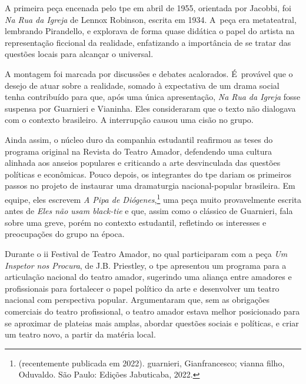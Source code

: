 {A primeira peça encenada pelo {\sc tpe} em abril de 1955, orientada por
Jacobbi, foi {\it Na Rua da Igreja} de Lennox Robinson, escrita em
1934. A~peça era metateatral, lembrando Pirandello, e explorava de forma
quase didática o papel do artista na representação ficcional da
realidade, enfatizando a importância de se tratar das questões locais
para alcançar o universal.

A montagem foi marcada por discussões e debates acalorados. É~provável
que o desejo de atuar sobre a realidade, somado à expectativa de um
drama social tenha contribuído para que, após uma única apresentação,
{\it Na Rua da Igreja} fosse suspensa por Guarnieri e Vianinha. Eles
consideraram que o texto não dialogava com o contexto brasileiro. A
interrupção causou uma cisão no grupo.

Ainda assim, o núcleo duro da companhia estudantil reafirmou as teses do
programa original na Revista do Teatro Amador, defendendo uma cultura
alinhada aos anseios populares e criticando a arte desvinculada das
questões políticas e econômicas. Pouco depois, os integrantes do {\sc tpe}
dariam os primeiros passos no projeto de instaurar uma dramaturgia
nacional-popular brasileira. Em equipe, eles escrevem {\it A Pipa de
Diógenes},\footnote{(recentemente publicada em 2022). {\sc guarnieri},
  Gianfrancesco; {\sc vianna filho}, Oduvaldo. São Paulo: Edições Jabuticaba,
  2022.} uma peça muito provavelmente escrita antes de {\it Eles não
usam black-tie} e que, assim como o clássico de Guarnieri, fala sobre
uma greve, porém no contexto estudantil, refletindo os interesses e
preocupações do grupo na época.

Durante o {\sc ii} Festival de Teatro Amador, no qual participaram com a peça
{\it Um Inspetor nos Procura}, de J.B. Priestley, o {\sc tpe} apresentou um
programa para a articulação nacional do teatro amador, sugerindo uma
aliança entre amadores e profissionais para fortalecer o papel político
da arte e desenvolver um teatro nacional com perspectiva popular.
Argumentaram que, sem as obrigações comerciais do teatro profissional, o
teatro amador estava melhor posicionado para se aproximar de plateias
mais amplas, abordar questões sociais e políticas, e criar um teatro
novo, a partir da matéria local.

}
